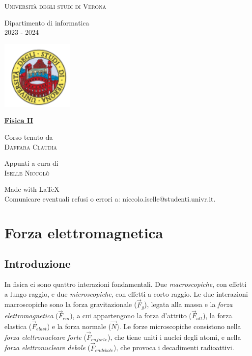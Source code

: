 \documentclass[a4peper, 12pt, twoside]{report}
\makeatletter
\newcommand{\CourseTitle}{Fisica II}
\newcommand{\Prof}{Daffara Claudia}
\newcommand{\AY}{2023 - 2024}
\newcommand{\email}{niccolo.iselle@studenti.univr.it}
\makeatother
\begin{document}
\begin{titlepage}
    \centering
    \textsc{Universit\`a degli studi di Verona}
    \par\vspace{0.5cm}
    \rmfamily
    Dipartimento di informatica \\
    \AY
    \par\vspace{1cm}
    \includegraphics[scale=0.5]{univr.png}
    \par\vspace{2cm}
    
    \textbf{\Huge{\underline{\CourseTitle}}}
    \par\vspace{0.5cm}
    
    \par\vspace{1cm}
    \footnotesize
    Corso tenuto da \\
    \normalsize
    \textsc{\Prof}
    \par\vspace{1cm}
    \footnotesize
    Appunti a cura di \\
    \normalsize
    \textsc{Iselle Niccol\`o}
    \par\vspace{1cm}
    
    \vfill
    \footnotesize
    Made with \LaTeX \\
    \small
    Comunicare eventuali refusi o errori a: \email.
\end{titlepage}
\afterpage{\blankpage}
\tableofcontents

\chapter{Forza elettromagnetica}
\section{Introduzione}

In fisica ci sono quattro interazioni fondamentali. Due \emph{macroscopiche}, con effetti a lungo raggio, e
due \emph{microscopiche}, con effetti a corto raggio.
Le due interazioni macroscopiche sono la forza gravitazionale (\emph{$\vec{F}_g$}), legata alla massa e
la \emph{forza elettromagnetica} ($\vec{F}_{em}$), a cui appartengono la forza d'attrito ($\vec{F}_{att}$), la 
forza elastica ($\vec{F}_{elast}$) e la forza normale ($\vec{N}$). Le forze microscopiche consistono nella
\emph{forza elettronucleare forte} ($\vec{F}_{enforte}$), che tiene uniti i nuclei degli atomi, e nella \emph{forza 
elettronucleare debole} ($\vec{F}_{endebole}$), che provoca i decadimenti radioattivi.
\end{document}
